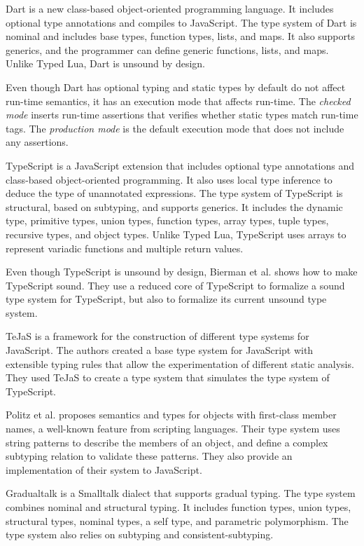 Dart \cite{dart} is a new class-based object-oriented programming
language.
It includes optional type annotations and compiles to JavaScript.
The type system of Dart is nominal and includes base types,
function types, lists, and maps.
It also supports generics, and the programmer can define
generic functions, lists, and maps.
Unlike Typed Lua, Dart is unsound by design.

Even though Dart has optional typing and static types by
default do not affect run-time semantics, it has an
execution mode that affects run-time.
The \emph{checked mode} inserts run-time assertions that
verifies whether static types match run-time tags.
The \emph{production mode} is the default execution mode
that does not include any assertions.

TypeScript \cite{typescript} is a JavaScript extension
that includes optional type annotations and class-based
object-oriented programming.
It also uses local type inference to deduce the type
of unannotated expressions.
The type system of TypeScript is structural, based
on subtyping, and supports generics.
It includes the dynamic type, primitive types, union types,
function types, array types, tuple types, recursive types, and
object types.
Unlike Typed Lua, TypeScript uses arrays to represent variadic
functions and multiple return values.

Even though TypeScript is unsound by design,
Bierman et al. \cite{bierman2014typescript} shows how to
make TypeScript sound.
They use a reduced core of TypeScript to formalize a
sound type system for TypeScript, but also to formalize
its current unsound type system.

TeJaS \cite{lerner2013tejas} is a framework for the construction of
different type systems for JavaScript.
The authors created a base type system for JavaScript with
extensible typing rules that allow the experimentation of
different static analysis.
They used TeJaS to create a type system that simulates the
type system of TypeScript.

Politz et al. \cite{politz2012semantics} proposes semantics
and types for objects with first-class member names, a well-known
feature from scripting languages.
Their type system uses string patterns to describe the members of
an object, and define a complex subtyping relation to validate
these patterns.
They also provide an implementation of their system to JavaScript.

Gradualtalk \cite{allende2013gts} is a Smalltalk dialect that
supports gradual typing.
The type system combines nominal and structural typing.
It includes function types, union types, structural types,
nominal types, a self type, and parametric polymorphism.
The type system also relies on subtyping and consistent-subtyping.


